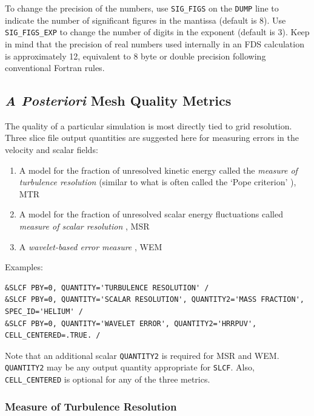 \documentclass[11pt]{book}
\newcommand{\ct}{\tt\small}
\begin{document}
\noindent
To change the precision of the numbers, use {\ct SIG\_FIGS} on the {\ct DUMP} line to indicate the number of significant figures in the mantissa (default is 8). Use
{\ct SIG\_FIGS\_EXP} to change the number of digits in the exponent (default is 3). Keep in mind that the precision of real numbers used internally in an FDS calculation
is approximately 12, equivalent to 8 byte or double precision following conventional Fortran rules.


\subsection{\emph{A Posteriori} Mesh Quality Metrics}
\label{info:meshquality}
The quality of a particular simulation is most directly tied to grid resolution.  Three slice file output quantities are suggested here for measuring errors in the velocity and scalar fields:
\begin{enumerate}
\item A model for the fraction of unresolved kinetic energy called the \emph{measure of turbulence resolution} (similar to what is often called the `Pope criterion' \cite{Pope:2004}), MTR
\item A model for the fraction of unresolved scalar energy fluctuations called \emph{measure of scalar resolution} \cite{Vervisch:2010}, MSR
\item A \emph{wavelet-based error measure} \cite{McDermott:2010}, WEM
\end{enumerate}
Examples:

\footnotesize
\begin{verbatim}
&SLCF PBY=0, QUANTITY='TURBULENCE RESOLUTION' /
&SLCF PBY=0, QUANTITY='SCALAR RESOLUTION', QUANTITY2='MASS FRACTION', SPEC_ID='HELIUM' /
&SLCF PBY=0, QUANTITY='WAVELET ERROR', QUANTITY2='HRRPUV', CELL_CENTERED=.TRUE. /
\end{verbatim} \normalsize
Note that an additional scalar {\ct QUANTITY2} is required for MSR and WEM.  {\ct QUANTITY2} may be any output quantity appropriate for {\ct SLCF}.
Also, {\ct CELL\_CENTERED} is optional for any of the three metrics.

\subsubsection{Measure of Turbulence Resolution}
\end{document}
